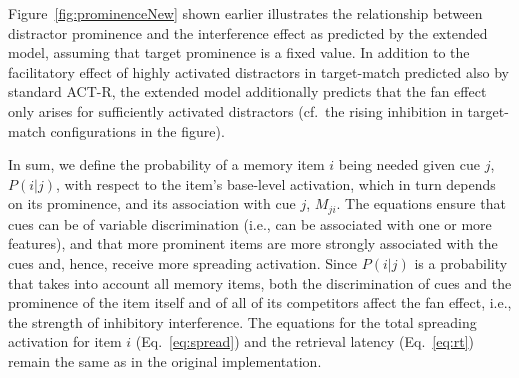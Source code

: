 \documentclass{cambridge7A}\usepackage[]{graphicx}\usepackage[]{color}
\newcommand{\revised}[1]{#1}
\begin{document}
Figure~\ref{fig:prominenceNew} shown earlier illustrates the relationship between distractor prominence and the interference effect as predicted by the extended model, assuming that target prominence is a \revised{fixed} value. 
 In addition to the facilitatory effect of highly activated distractors in target-match predicted also by standard ACT-R, 
the extended model additionally predicts that the fan effect only arises for sufficiently activated distractors (cf.\ the rising inhibition in target-match configurations in the figure). 

In sum, we define the probability of a memory item $i$ being needed given cue $j$, $P(i|j)$, with respect to the item's base-level activation, which in turn depends on its prominence, and its association with cue $j$, $M_{ji}$. The equations ensure that cues can be of variable discrimination (i.e., can be associated with one or more features), and that more  prominent items are more strongly associated with the cues and, hence, receive more spreading activation. Since $P(i|j)$ is a probability that takes into account all memory items, both the discrimination of cues and the prominence of the item itself and of all of its competitors affect the fan effect, i.e., the strength of inhibitory interference. 
The equations for the total spreading activation for item $i$ (Eq.~\ref{eq:spread}) and the retrieval latency (Eq.~\ref{eq:rt}) remain the same as in the original implementation.


\end{document}
